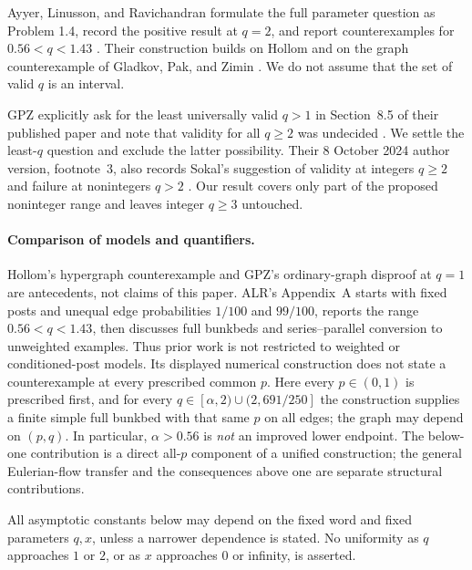\documentclass[11pt,a4paper]{article}
\theoremstyle{remark}\newtheorem{remark}[theorem]{Remark}
\begin{document}
Ayyer, Linusson, and Ravichandran formulate the full parameter question as Problem 1.4, record the positive result at $q=2$, and report counterexamples for $0.56<q<1.43$ \cite{ALR}. Their construction builds on Hollom and on the graph counterexample of Gladkov, Pak, and Zimin \cite{GPZ,Hollom}. We do not assume that the set of valid $q$ is an interval.

GPZ explicitly ask for the least universally valid $q>1$ in Section~8.5 of their published paper and note that validity for all $q\ge2$ was undecided \cite{GPZ}. We settle the least-$q$ question and exclude the latter possibility. Their 8 October 2024 author version, footnote~3, also records Sokal's suggestion of validity at integers $q\ge2$ and failure at nonintegers $q>2$ \cite{GPZauthor}. Our result covers only part of the proposed noninteger range and leaves integer $q\ge3$ untouched.

\paragraph{Comparison of models and quantifiers.}
Hollom's hypergraph counterexample and GPZ's ordinary-graph disproof at $q=1$ are antecedents, not claims of this paper. ALR's Appendix~A starts with fixed posts and unequal edge probabilities $1/100$ and $99/100$, reports the range $0.56<q<1.43$, then discusses full bunkbeds and series--parallel conversion to unweighted examples. Thus prior work is not restricted to weighted or conditioned-post models. Its displayed numerical construction does not state a counterexample at every prescribed common $p$. Here every $p\in(0,1)$ is prescribed first, and for every $q\in[\alpha,2)\cup(2,691/250]$ the construction supplies a finite simple full bunkbed with that same $p$ on all edges; the graph may depend on $(p,q)$. In particular, $\alpha>0.56$ is \emph{not} an improved lower endpoint. The below-one contribution is a direct all-$p$ component of a unified construction; the general Eulerian-flow transfer and the consequences above one are separate structural contributions.

All asymptotic constants below may depend on the fixed word and fixed parameters $q,x$, unless a narrower dependence is stated. No uniformity as $q$ approaches $1$ or $2$, or as $x$ approaches $0$ or infinity, is asserted.
\end{document}
